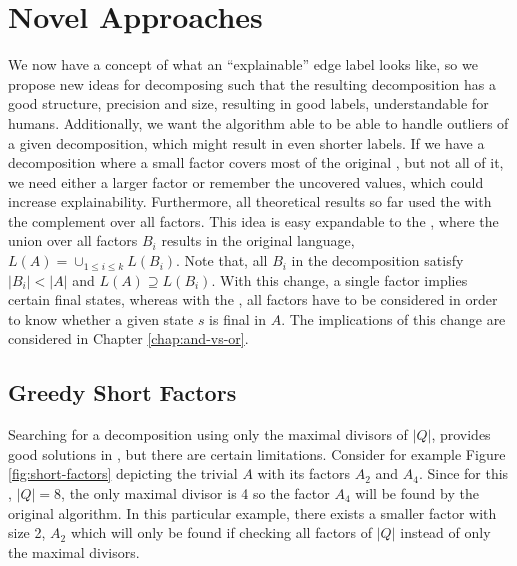 \chapter{Novel Approaches}
\label{chap:novel-algos}
We now have a concept of what an \enquote{explainable} edge label looks like, so we propose new ideas for decomposing \DFAs such that the resulting decomposition has a good structure, precision and size, resulting in good labels, understandable for humans.
Additionally, we want the algorithm able to be able to handle outliers of a given decomposition, which might result in even shorter labels.
If we have a decomposition where a small factor covers most of the original \DFA, but not all of it, we need either a larger factor or remember the uncovered values, which could increase explainability.
Furthermore, all theoretical results so far used the \andDecomp with the complement over all factors.
This idea is easy expandable to the \orDecomp, where the union over all factors $B_i$ results in the original language, $L(A) = \cup_{1\leq i \leq k} L(B_i)$. Note that, all $B_i$ in the decomposition satisfy $|B_i| < |A|$ and $L(A) \supseteq L(B_i)$. With this change, a single factor implies certain final states, whereas with the \andDecomp, all factors have to be considered in order to know whether a given state $s$ is final in $A$.
The implications of this change are considered in Chapter \ref{chap:and-vs-or}.

\section{Greedy Short Factors}
\label{ch:novel-algos:greedy-short-factors}
Searching for a decomposition using only the maximal divisors of $|Q|$, provides good solutions in \LogSpace, but there are certain limitations.
Consider for example Figure \ref{fig:short-factors} depicting the trivial \DFA $A$ with its factors $A_2$ and $A_4$.
Since for this \DFA, $|Q| = 8$, the only maximal divisor is 4 so the factor $A_4$ will be found by the original algorithm.
In this particular example, there exists a smaller factor with size 2, $A_2$ which will only be found if checking all factors of $|Q|$ instead of only the maximal divisors.


